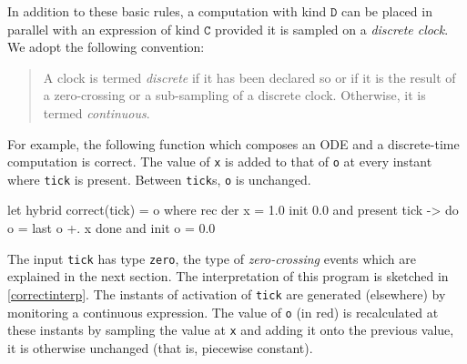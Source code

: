 \documentclass[11pt,titlepage,twoside]{report}
\makeatletter
\newcommand{\zls}[1]{{\@span{class="zelusinline"}#1}}
\newcommand{\zls}[1]{\texttt{#1}}
\renewcommand{\zls}[1]{\texttt{#1}}
\newcommand{\NodeKind}{\ensuremath{\mathtt{D}}}
\newcommand{\HybridKind}{\ensuremath{\mathtt{C}}}
\makeatother
\begin{document}
In addition to these basic rules, a computation with kind \NodeKind{} can be 
placed in parallel with an expression of kind \HybridKind{} provided it is 
sampled on a \emph{discrete clock}.
We adopt the following convention:
\begin{quote}
A clock is termed \emph{discrete} if it has been declared so or if it is the 
result of a zero-crossing or a sub-sampling of a discrete clock.
Otherwise, it is termed \emph{continuous}.
\end{quote}
For example, the following function which composes an ODE and a 
discrete-time computation is correct.
The value of \zls{x} is added to that of \zls{o} at every instant where 
\zls{tick} is present.
Between \zls{tick}s, \zls{o} is unchanged.
\begin{chklisting}[withresult]
let hybrid correct(tick) = o where
  rec der x = 1.0 init 0.0
  and present tick -> do o = last o +. x done
  and init o = 0.0
\end{chklisting}
The input \zls{tick} has type \zls{zero}, the type of \emph{zero-crossing} 
events which are explained in the next section.
The interpretation of this program is sketched in \cref{correctinterp}.
The instants of activation of \zls{tick} are generated (elsewhere) by 
monitoring a continuous expression.
The value of \zls{o} (in red) is recalculated at these instants by sampling 
the value at \zls{x} and adding it onto the previous value, it is otherwise 
unchanged (that is, piecewise constant).
\end{document}

